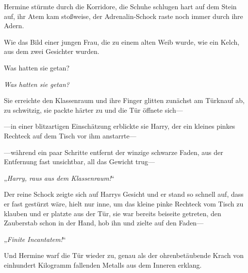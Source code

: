 \later

Hermine stürmte durch die Korridore, die Schuhe schlugen hart auf dem Stein auf, ihr Atem kam stoßweise, der Adrenalin-Schock raste noch immer durch ihre Adern.

Wie das Bild einer jungen Frau, die zu einem alten Weib wurde, wie ein Kelch, aus dem zwei Gesichter wurden.

Was hatten sie getan?

\emph{Was hatten sie getan?}

Sie erreichte den Klassenraum und ihre Finger glitten zunächst am Türknauf ab, zu schwitzig, sie packte härter zu und die Tür öffnete sich—

—in einer blitzartigen Einschätzung erblickte sie Harry, der ein kleines pinkes Rechteck auf dem Tisch vor ihm anstarrte—

—während ein paar Schritte entfernt der winzige schwarze Faden, aus der Entfernung fast unsichtbar, all das Gewicht trug—

„\emph{Harry, raus aus dem Klassenraum!}“

Der reine Schock zeigte sich auf Harrys Gesicht und er stand so schnell auf, dass er fast gestürzt wäre, hielt nur inne, um das kleine pinke Rechteck vom Tisch zu klauben und er platzte aus der Tür, sie war bereits beiseite getreten, den Zauberstab schon in der Hand, hob ihn und zielte auf den Faden—

„\emph{Finite Incantatem!}“

Und Hermine warf die Tür wieder zu, genau als der ohrenbetäubende Krach von einhundert Kilogramm fallenden Metalls aus dem Inneren erklang.

